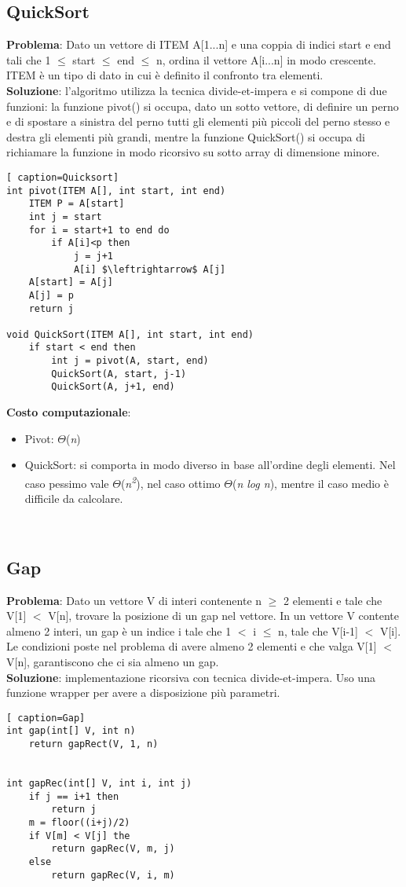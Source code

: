 \documentclass[../cheatSheetAlgoritmi.tex]{subfiles}
\begin{document}
\subsection{QuickSort}
\textbf{Problema}: Dato un vettore di ITEM A[1...n] e una coppia di indici start e end tali che 1  $\leq$ start  $\leq$ end  $\leq$ n, ordina il vettore A[i...n] in modo crescente. ITEM è un tipo di dato in cui è definito il confronto tra elementi.\\
\textbf{Soluzione}: l'algoritmo utilizza la tecnica divide-et-impera e si compone di due funzioni: la funzione pivot() si occupa, dato un sotto vettore, di definire un perno e di spostare a sinistra del perno tutti gli elementi più piccoli del perno stesso e  destra  gli elementi più grandi, mentre la funzione QuickSort() si occupa di richiamare la funzione in modo ricorsivo su sotto array di dimensione minore.\
\begin{lstlisting}[ caption=Quicksort]
int pivot(ITEM A[], int start, int end)
	ITEM P = A[start]
	int j = start
	for i = start+1 to end do
		if A[i]<p then 
			j = j+1
			A[i] $\leftrightarrow$ A[j]
	A[start] = A[j]
	A[j] = p	
	return j

void QuickSort(ITEM A[], int start, int end)
	if start < end then
		int j = pivot(A, start, end)
		QuickSort(A, start, j-1)
		QuickSort(A, j+1, end)		
\end{lstlisting}
\textbf{Costo computazionale}:
\begin{itemize}
 	\item Pivot: $\Theta$(\textit{n}) 
 	\item QuickSort: si comporta in modo diverso in base all'ordine degli elementi. Nel caso pessimo vale $\Theta$(\textit{n\textsuperscript{2}}), nel caso ottimo  $\Theta$(\textit{n log n}), mentre il caso medio è difficile da calcolare. 
\end{itemize}
\


\subsection{Gap}
\textbf{Problema}: Dato un vettore V di interi contenente n $\geq$ 2 elementi e tale che V[1] $<$ V[n], trovare la posizione di un gap nel vettore. In un vettore V contente almeno 2 interi, un gap è un indice i tale che 1 $<$ i $\leq$ n, tale che V[i-1] $<$ V[i]. Le condizioni poste nel problema di avere almeno 2 elementi e che valga V[1] $<$ V[n], garantiscono che ci sia almeno un gap.\\
\textbf{Soluzione}: implementazione ricorsiva con tecnica divide-et-impera. Uso una funzione wrapper per avere a disposizione più parametri.
\newpage
\begin{lstlisting}[ caption=Gap]
int gap(int[] V, int n)
	return gapRect(V, 1, n)
	

int gapRec(int[] V, int i, int j)
	if j == i+1 then
		return j
	m = floor((i+j)/2)
	if V[m] < V[j] the
		return gapRec(V, m, j)
	else 
		return gapRec(V, i, m)
\end{lstlisting}\
\end{document}
